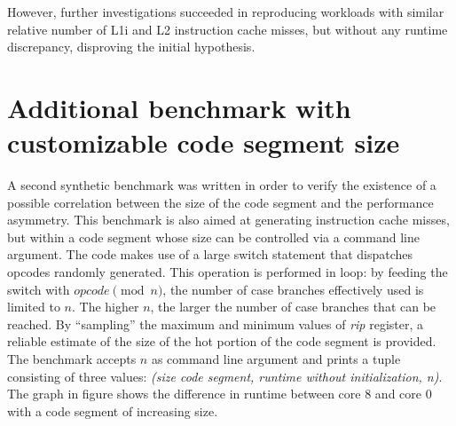 \documentclass[a4paper]{jpconf}
\begin{document}

However, further investigations succeeded in reproducing 
workloads with similar relative number of L1i and L2 instruction cache misses,
but without any runtime discrepancy, disproving the initial hypothesis.

\section{Additional benchmark with customizable code segment size}
A second synthetic benchmark was written in order to verify the existence of a 
possible correlation between the size of the code segment and the performance 
asymmetry. This benchmark is also aimed at generating instruction cache misses,
but within a code segment whose size can be controlled via a command line 
argument. The code makes use of a large switch statement that dispatches
opcodes randomly generated. This operation is performed in loop: 
by feeding the switch with $opcode \pmod n$, the number of case 
branches effectively used is limited to $n$. The higher $n$, the larger the
number of case branches that can be reached. By ``sampling'' the 
maximum and minimum values of \textit{rip} register, a reliable estimate of the 
size of the hot portion of the code segment is provided. The
benchmark accepts $n$ as command line argument and prints a tuple consisting of
three values: \textit{(size code segment, runtime without initialization, n)}.
The graph in figure shows the difference in runtime between core 8 and core 0
with a code segment of increasing size.
\end{document}
